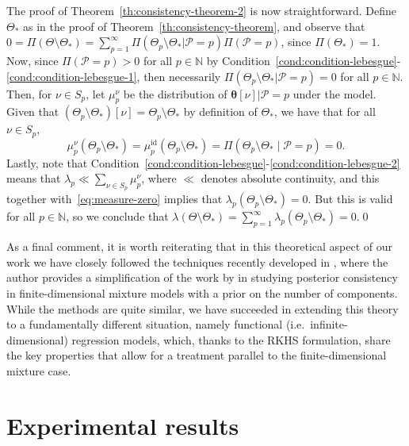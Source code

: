 \documentclass{article}
\numberwithin{equation}{section}
\theoremstyle{plain}
\newcommand{\N}{\mathbb{N}}
\begin{document}
The proof of Theorem~\ref{th:consistency-theorem-2} is now straightforward. Define \(\Theta_*\) as in the proof of Theorem~\ref{th:consistency-theorem}, and observe that \(
0=\Pi(\Theta \setminus \Theta_*) = \sum_{p=1}^\infty \Pi(\Theta_p \setminus \Theta_*|\mathcal P = p)\Pi(\mathcal P = p)
\), since \(\Pi(\Theta_*)=1\). Now, since \(\Pi(\mathcal P = p)> 0\) for all \(p\in\N\) by Condition~\ref{cond:condition-lebesgue}-\ref{cond:condition-lebesgue-1}, then necessarily \(\Pi(\Theta_p\setminus \Theta_*|\mathcal P = p) = 0\) for all \(p \in \N\). Then, for \(\nu \in S_p\), let \(\mu^\nu_p\) be the distribution of \(\bm\theta[\nu]|\mathcal P=p\) under the model. Given that \((\Theta_p\setminus \Theta_*)[\nu] = \Theta_p \setminus \Theta_*\) by definition of \(\Theta_*\), we have that for all \(\nu\in S_p\),
\begin{equation}\label{eq:measure-zero}
  \mu^\nu_p (\Theta_p \setminus \Theta_*) = \mu_p^{\text{id}} (\Theta_p \setminus \Theta_*) = \Pi (\Theta_p \setminus \Theta_*\mid\mathcal P = p) =0.
\end{equation}
Lastly, note that Condition~\ref{cond:condition-lebesgue}-\ref{cond:condition-lebesgue-2} means that \(\lambda_p \ll \sum_{\nu\in S_p}\mu^\nu_p\), where \(\ll\) denotes absolute continuity, and this together with~\eqref{eq:measure-zero} implies that \(\lambda_p(\Theta_p \setminus \Theta_*)=0\). But this is valid for all \(p\in\N\), so we conclude that \(
\lambda(\Theta\setminus \Theta_*) = \sum_{p=1}^\infty \lambda_p(\Theta_p\setminus \Theta_*)=0\).\qed{}

As a final comment, it is worth reiterating that in this theoretical aspect of our work we have closely followed the techniques recently developed in \citet{miller2023consistency}, where the author provides a simplification of the work by \citet{nobile1994bayesian} in studying posterior consistency in finite-dimensional mixture models with a prior on the number of components. While the methods are quite similar, we have succeeded in extending this theory to a fundamentally different situation, namely functional (i.e.\ infinite-dimensional) regression models, which, thanks to the RKHS formulation, share the key properties that allow for a treatment parallel to the finite-dimensional mixture case.


\section{Experimental results}\label{sec:results}
\end{document}
